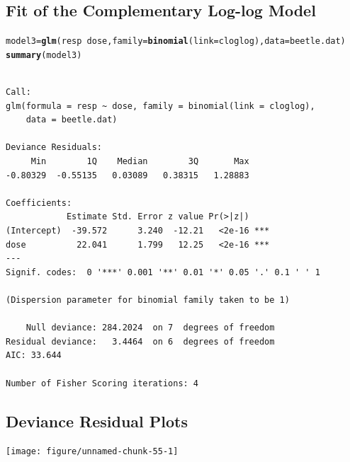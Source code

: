 \documentclass{article}\usepackage[]{graphicx}\usepackage[svgnames]{xcolor}
\makeatletter
\newcommand{\hlopt}[1]{\textcolor[rgb]{0,0,0}{#1}}%
\newcommand{\hlstd}[1]{\textcolor[rgb]{0.345,0.345,0.345}{#1}}%
\newcommand{\hlkwb}[1]{\textcolor[rgb]{0.69,0.353,0.396}{#1}}%
\newcommand{\hlkwc}[1]{\textcolor[rgb]{0.333,0.667,0.333}{#1}}%
\newcommand{\hlkwd}[1]{\textcolor[rgb]{0.737,0.353,0.396}{\textbf{#1}}}%
\newenvironment{kframe}{%
 \def\at@end@of@kframe{}%
 \ifinner\ifhmode%
  \def\at@end@of@kframe{\end{minipage}}%
  \begin{minipage}{\columnwidth}%
 \fi\fi%
 \def\FrameCommand##1{\hskip\@totalleftmargin \hskip-\fboxsep
 \colorbox{shadecolor}{##1}\hskip-\fboxsep
     \hskip-\linewidth \hskip-\@totalleftmargin \hskip\columnwidth}%
 \MakeFramed {\advance\hsize-\width
   \@totalleftmargin\z@ \linewidth\hsize
   \@setminipage}}%
 {\par\unskip\endMakeFramed%
 \at@end@of@kframe}
\newenvironment{knitrout}{}{} %
\makeatother
\begin{document}
\subsection*{Fit of the Complementary Log-log Model}
\begin{knitrout}
\color{fgcolor}\begin{kframe}
\begin{alltt}
\hlstd{model3} \hlkwb{=} \hlkwd{glm}\hlstd{(resp} \hlopt{~} \hlstd{dose,} \hlkwc{family} \hlstd{=} \hlkwd{binomial}\hlstd{(}\hlkwc{link} \hlstd{= cloglog),} \hlkwc{data} \hlstd{= beetle.dat)}
\hlkwd{summary}\hlstd{(model3)}
\end{alltt}
\begin{verbatim}

Call:
glm(formula = resp ~ dose, family = binomial(link = cloglog), 
    data = beetle.dat)

Deviance Residuals: 
     Min        1Q    Median        3Q       Max  
-0.80329  -0.55135   0.03089   0.38315   1.28883  

Coefficients:
            Estimate Std. Error z value Pr(>|z|)    
(Intercept)  -39.572      3.240  -12.21   <2e-16 ***
dose          22.041      1.799   12.25   <2e-16 ***
---
Signif. codes:  0 '***' 0.001 '**' 0.01 '*' 0.05 '.' 0.1 ' ' 1

(Dispersion parameter for binomial family taken to be 1)

    Null deviance: 284.2024  on 7  degrees of freedom
Residual deviance:   3.4464  on 6  degrees of freedom
AIC: 33.644

Number of Fisher Scoring iterations: 4
\end{verbatim}
\end{kframe}
\end{knitrout}
\subsection*{Deviance Residual Plots}
\begin{knitrout}
\color{fgcolor}

{\centering \texttt{[image: figure/unnamed-chunk-55-1]} 

}


\end{knitrout}
\end{document}
